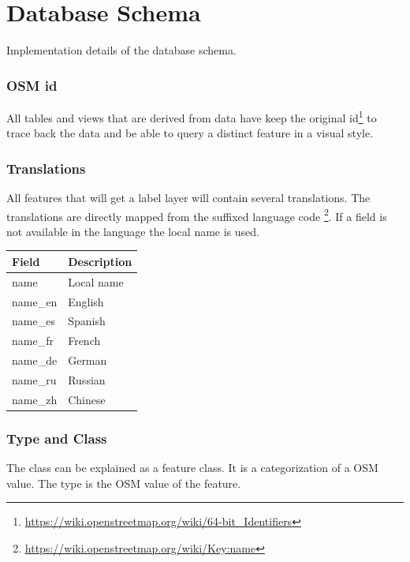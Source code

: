 \section{Database Schema}

Implementation details of the database schema.

\subsubsection{OSM id}
All tables and views that are derived from \osm{} data have keep the original id\footnote{\url{https://wiki.openstreetmap.org/wiki/64-bit_Identifiers}}
to trace back the data and be able to query a distinct \osm{} feature in a visual style.

\subsubsection{Translations}
All features that will get a label layer will contain several translations.
The translations are directly mapped from the suffixed language code \footnote{\url{https://wiki.openstreetmap.org/wiki/Key:name}}. If a field is not available
in the language the local name is used.

\begin{flushleft}
    \begin{tabular}{ll}
    \hline
     Field    & 	Description                                    \\
    \hline
    name      & Local name  \\
    name\_en	 & English                          \\
    name\_es	 & Spanish                          \\
    name\_fr	 & French                           \\
    name\_de	 & German                           \\
    name\_ru	 & Russian                          \\
    name\_zh	 & Chinese                          \\
    \end{tabular}
\end{flushleft}

\subsubsection{Type and Class}
The class can be explained as a feature class. It is a categorization of a OSM value.
The type is the OSM value of the feature.

